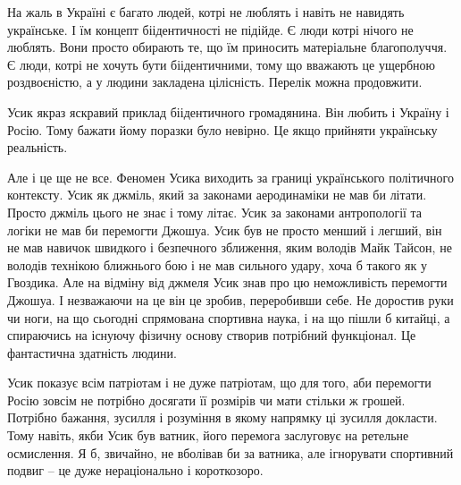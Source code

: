 На жаль в Україні є багато людей, котрі не люблять і навіть не навидять
українське. І їм концепт біідентичності не підійде. Є люди котрі нічого не
люблять. Вони просто обирають те, що їм приносить матеріальне благополуччя. Є
люди, котрі не хочуть бути біідентичними, тому що вважають це ущербною
роздвоєністю, а у людини закладена цілісність. Перелік можна продовжити.

Усик якраз яскравий приклад біідентичного громадянина. Він любить і Україну і
Росію. Тому бажати йому поразки було невірно. Це якщо прийняти українську
реальність. 

Але і це ще не все. Феномен Усика виходить за границі українського політичного
контексту. Усик як  джміль, який за законами аеродинаміки не  мав би літати.
Просто джміль цього не знає і тому літає. Усик за законами антропології  та
логіки не мав би перемогти Джошуа. Усик був не просто менший і легший, він не
мав навичок швидкого і безпечного зближення, яким володів Майк Тайсон, не
володів технікою ближнього бою і не мав сильного удару, хоча б такого як у
Гвоздика. Але на відміну від джмеля Усик знав про цю неможливість перемогти
Джошуа. І незважаючи на це він це зробив, переробивши себе. Не доростив руки чи
ноги, на що сьогодні спрямована спортивна наука, і на що пішли б китайці, а
спираючись на існуючу фізичну основу створив потрібний функціонал. Це
фантастична здатність людини.

Усик показує всім патріотам і не дуже патріотам, що для того, аби перемогти
Росію зовсім не потрібно досягати її розмірів чи мати стільки ж грошей.
Потрібно бажання, зусилля і розуміння в якому напрямку ці зусилля докласти.
Тому навіть, якби Усик був ватник, його перемога заслуговує на ретельне
осмислення. Я б, звичайно, не вболівав би за ватника, але ігнорувати спортивний
подвиг – це дуже нераціонально і короткозоро.

